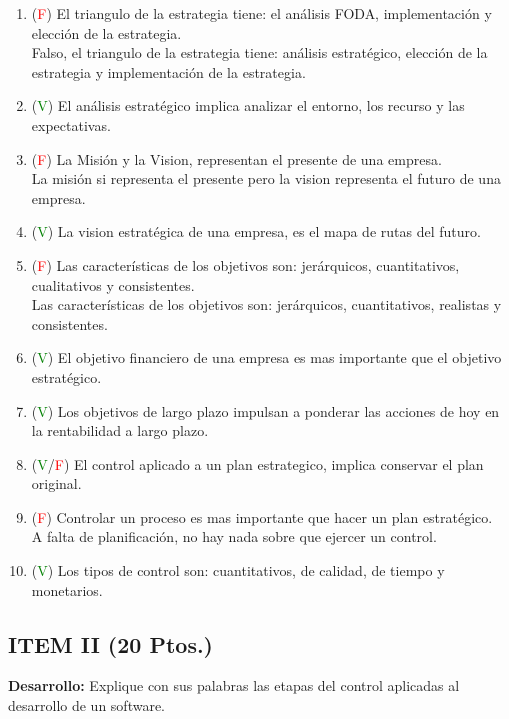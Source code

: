 \documentclass{templateNote}
\begin{document}
\begin{enumerate}
    \item (\textcolor{red}{F}) El triangulo de la estrategia tiene: el análisis FODA, implementación y elección de la estrategia.
    \\ Falso, el triangulo de la estrategia tiene: análisis estratégico, elección de la estrategia y implementación de la estrategia.
    \item (\textcolor{green}{V}) El análisis estratégico implica analizar el entorno, los recurso y las expectativas.
    \\ 
    \item (\textcolor{red}{F}) La Misión y la Vision, representan el presente de una empresa.
    \\ La misión si representa el presente pero la vision representa el futuro de una empresa.
    \item (\textcolor{green}{V}) La vision estratégica de una empresa, es el mapa de rutas del futuro.
    \\ 
    \item (\textcolor{red}{F}) Las características de los objetivos son: jerárquicos, cuantitativos, cualitativos y consistentes.
    \\ Las características de los objetivos son: jerárquicos, cuantitativos, realistas y consistentes.
    \item (\textcolor{green}{V}) El objetivo financiero de una empresa es mas importante que el objetivo estratégico.
    \\ 
    \item (\textcolor{green}{V}) Los objetivos de largo plazo impulsan a ponderar las acciones de hoy en la rentabilidad a largo plazo.
    \\ 
    \item (\textcolor{green}{V}/\textcolor{red}{F}) El control aplicado a un plan estrategico, implica conservar el plan original.
    \\  
    \item (\textcolor{red}{F}) Controlar un proceso es mas importante que hacer un plan estratégico.
    \\ A falta de planificación, no hay nada sobre que ejercer un control.
    \item (\textcolor{green}{V}) Los tipos de control son: cuantitativos, de calidad, de tiempo y monetarios.
    \\ 
\end{enumerate}

\newpage
\subsection*{ITEM II (20 Ptos.)}
\noindent\textbf{Desarrollo:} Explique con sus palabras las etapas del control aplicadas al desarrollo de un software. \\
\end{document}

